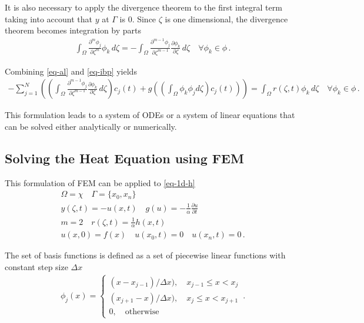 It is also necessary to apply the divergence theorem to the first integral term taking into account that \(y\) at \(\Gamma\) is 0.
Since \(\zeta\) is one dimensional, the divergence theorem becomes integration by parts
\begin{gather}
\int_{\Omega} \frac{\partial^{m} \phi_{j}}{\partial \zeta^{m}} \phi_{k} \, d\zeta = - \int_{\Omega} \frac{\partial^{m-1} \phi_{j}}{\partial \zeta^{m-1}} \frac{\partial \phi_{k}}{\partial \zeta} \, d\zeta \quad \forall \phi_{k} \in \phi \,. \label{eq-ibp}
\end{gather}


Combining \ref{eq-al} and \ref{eq-ibp} yields
\begin{gather}
-\sum_{j = 1}^{N} \left(\left(\int_{\Omega} \frac{\partial^{m-1} \phi_{j}}{\partial \zeta^{m-1}} \frac{\partial \phi_{k}}{\partial \zeta} \, d\zeta\right) c_{j}(t) + g\left(\left(\int_{\Omega} \phi_k \phi_j d\zeta\right) c_{j}(t)\right)\right)  = \int_{\Omega}  r(\zeta, t) \phi_{k}        \, d\zeta \quad \forall \phi_{k} \in \phi \,. \label{eq-fem}
\end{gather}


This formulation leads to a system of ODEs or a system of linear equations that can be solved either analytically or numerically.
\subsection{Solving the Heat Equation using FEM}
This formulation of FEM can be applied to \ref{eq-1d-h}
\begin{gather}
\Omega = \chi \quad \Gamma = \{x_{0}, x_{n}\} \\
y(\zeta, t) = -u(x, t) \quad g(u) = -\frac{1}{\alpha} \frac{\partial u}{\partial t} \\
m = 2 \quad r(\zeta, t) = \frac{1}{\alpha} h(x,t) \\
u(x, 0) = f(x) \quad u(x_{0}, t) = 0 \quad u(x_{n}, t) = 0 \,.
\end{gather}


The set of basis functions is defined as a set of piecewise linear functions with constant step size \(\Delta x\)
\begin{gather}
    \phi_j(x)= 
\begin{cases}
    (x - x_{j-1}) / \Delta x), \quad x_{j-1} \leq x <  x_{j}\\
    (x_{j+1} - x) / \Delta x), \quad x_{j} \leq x <  x_{j + 1}\\
    0,              \quad \text{otherwise}
\end{cases} \,.
\end{gather}
\cite{Gustafsson2011d}


